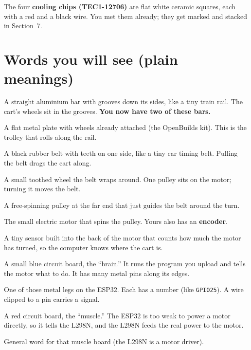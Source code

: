 \documentclass[11pt,a4paper]{article}
\begin{document}
\noindent The four \textbf{cooling chips (TEC1-12706)} are flat white ceramic squares, each with a red and
a black wire. You met them already; they get marked and stacked in Section~7.


\section{Words you will see (plain meanings)}

\begin{description}[leftmargin=2.2cm,style=nextline,itemsep=2pt]
  \item[V-slot rail] A straight aluminium bar with grooves down its sides, like a tiny train rail. The
  cart's wheels sit in the grooves. \textbf{You now have two of these bars.}
  \item[Gantry plate / cart] A flat metal plate with wheels already attached (the OpenBuilds kit). This
  is the trolley that rolls along the rail.
  \item[GT2 belt] A black rubber belt with teeth on one side, like a tiny car timing belt. Pulling the
  belt drags the cart along.
  \item[Pulley] A small toothed wheel the belt wraps around. One pulley sits on the motor; turning it
  moves the belt.
  \item[Idler] A free-spinning pulley at the far end that just guides the belt around the turn.
  \item[Motor (GA25-370)] The small electric motor that spins the pulley. Yours also has an
  \textbf{encoder}.
  \item[Encoder] A tiny sensor built into the back of the motor that counts how much the motor has
  turned, so the computer knows where the cart is.
  \item[ESP32] A small blue circuit board, the ``brain.'' It runs the program you upload and tells the
  motor what to do. It has many metal pins along its edges.
  \item[Pin / GPIO] One of those metal legs on the ESP32. Each has a number (like \texttt{GPIO25}). A
  wire clipped to a pin carries a signal.
  \item[L298N] A red circuit board, the ``muscle.'' The ESP32 is too weak to power a motor directly, so
  it tells the L298N, and the L298N feeds the real power to the motor.
  \item[Driver] General word for that muscle board (the L298N is a motor driver).

\end{description}
\end{document}
